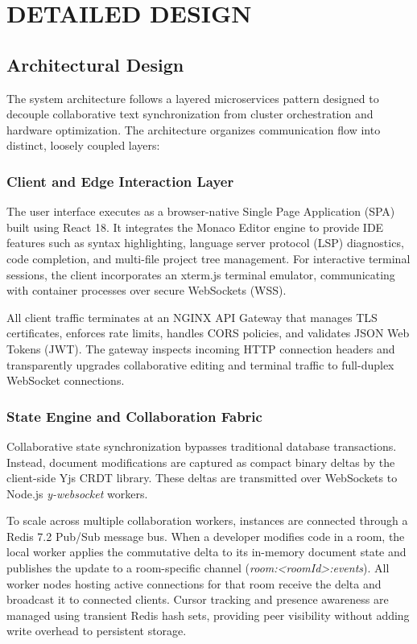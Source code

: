 \documentclass[12pt,a4paper]{report}
\begin{document}
	\chapter{DETAILED DESIGN}
	
	\section{Architectural Design}
	The system architecture follows a layered microservices pattern designed to decouple collaborative text synchronization from cluster orchestration and hardware optimization. The architecture organizes communication flow into distinct, loosely coupled layers:
	
	\subsection{Client and Edge Interaction Layer}
	The user interface executes as a browser-native Single Page Application (SPA) built using React 18. It integrates the Monaco Editor engine to provide IDE features such as syntax highlighting, language server protocol (LSP) diagnostics, code completion, and multi-file project tree management. For interactive terminal sessions, the client incorporates an xterm.js terminal emulator, communicating with container processes over secure WebSockets (WSS).
	
	All client traffic terminates at an NGINX API Gateway that manages TLS certificates, enforces rate limits, handles CORS policies, and validates JSON Web Tokens (JWT). The gateway inspects incoming HTTP connection headers and transparently upgrades collaborative editing and terminal traffic to full-duplex WebSocket connections.
	
	\subsection{State Engine and Collaboration Fabric}
	Collaborative state synchronization bypasses traditional database transactions. Instead, document modifications are captured as compact binary deltas by the client-side Yjs CRDT library. These deltas are transmitted over WebSockets to Node.js \textit{y-websocket} workers.
	
	To scale across multiple collaboration workers, instances are connected through a Redis 7.2 Pub/Sub message bus. When a developer modifies code in a room, the local worker applies the commutative delta to its in-memory document state and publishes the update to a room-specific channel (\textit{room:<roomId>:events}). All worker nodes hosting active connections for that room receive the delta and broadcast it to connected clients. Cursor tracking and presence awareness are managed using transient Redis hash sets, providing peer visibility without adding write overhead to persistent storage.
	
\end{document}
